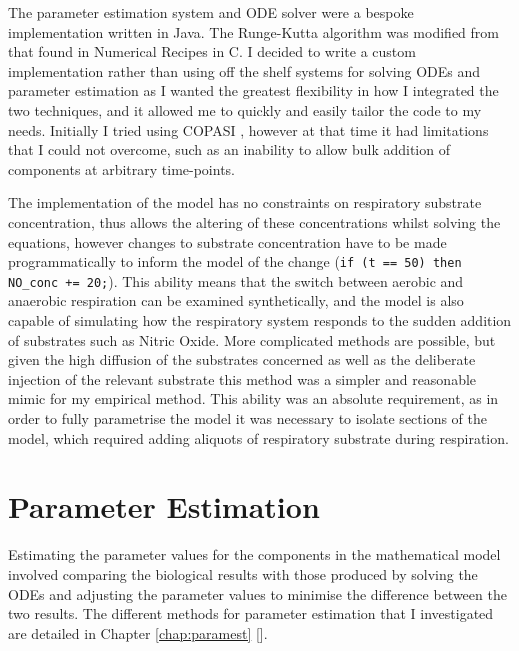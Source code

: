 The parameter estimation system and ODE solver were a bespoke implementation written in Java. The Runge-Kutta algorithm was modified from that found in Numerical Recipes in C\cite{Press1992}. I decided to write a custom implementation rather than using off the shelf systems for solving ODEs and parameter estimation as I wanted the greatest flexibility in how I integrated the two techniques, and it allowed me to quickly and easily tailor the code to my needs. Initially I tried using COPASI \cite{Hoops2006}, however at that time it had limitations that I could not overcome, such as an inability to allow bulk addition of components at arbitrary time-points.

The implementation of the model has no constraints on respiratory substrate concentration, thus allows the altering of these concentrations whilst solving the equations, however changes to substrate concentration have to be made programmatically to inform the model of the change (\texttt{if (t == 50) then NO\_conc += 20;}). This ability means that the switch between aerobic and anaerobic respiration can be examined synthetically, and the model is also capable of simulating how the respiratory system responds to the sudden addition of substrates such as Nitric Oxide. More complicated methods are possible, but given the high diffusion of the substrates concerned as well as the deliberate injection of the relevant substrate this method was a simpler and reasonable mimic for my empirical method. This ability was an absolute requirement, as in order to fully parametrise the model it was necessary to isolate sections of the model, which required adding aliquots of respiratory substrate during respiration.


\section{Parameter Estimation}
Estimating the parameter values for the components in the mathematical model involved comparing the biological results with those produced by solving the ODEs and adjusting the parameter values to minimise the difference between the two results. The different methods for parameter estimation that I investigated are detailed in Chapter \ref{chap:paramest} [].